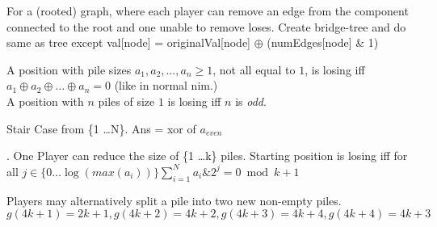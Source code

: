  For a (rooted) graph, where each player can remove an edge from the component connected to the root and one unable to remove loses. Create bridge-tree and do same as tree except val[node] = originalVal[node] $\oplus$ (numEdges[node] \& 1)

 A position with pile sizes $a_1, a_2, \dots, a_n \ge 1$, not all equal to $1$, is losing iff $a_1 \oplus a_2 \oplus \dots \oplus a_n = 0$ (like in normal nim.)\\
A position with $n$ piles of size $1$ is losing iff $n$ is \emph{odd}.

 Stair Case from \{1 \ldots N\}. Ans = xor of $a_{even}$ 

. One Player can reduce the size of \{1 \ldots k\} piles. Starting position is losing iff for all $j \in \{0 \ldots \log(max(a_i))\} \sum_{i=1}^{N} a_{i}\&2^{j} = 0 \bmod k + 1$

 Players may alternatively split a pile into two new non-empty piles. $g(4k + 1) = 2k + 1, g(4k + 2) = 4k + 2, g(4k + 3) = 4k + 4, g(4k + 4) = 4k + 3$

